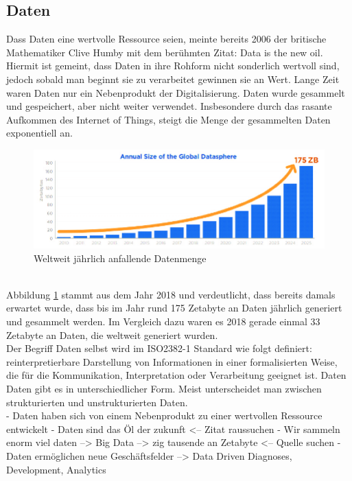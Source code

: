 \begin{onehalfspace}
    \subsection{Daten}
    \label{subsubsec:daten}
        Dass Daten eine wertvolle Ressource seien, meinte bereits 2006 der britische Mathematiker Clive Humby mit dem berühmten Zitat: \glqq{}Data is the new oil\grqq{}. Hiermit ist gemeint, dass Daten in ihre Rohform nicht sonderlich wertvoll sind, jedoch sobald man beginnt sie zu verarbeitet gewinnen sie an Wert. Lange Zeit waren Daten nur ein Nebenprodukt der Digitalisierung. Daten wurde gesammelt und gespeichert, aber nicht weiter verwendet. Insbesondere durch das rasante Aufkommen des Internet of Things, steigt  die Menge der gesammelten Daten exponentiell an.\cite{Otto2019}
        \begin{figure}[h]
            \centering
            \includegraphics[width = 15cm]{Bilder/Annual_Data_Size.png}
            \caption{Weltweit jährlich anfallende Datenmenge \cite{Reinsel2018}}
            \label{fig:DataSize}
        \end{figure} 
        \\
        Abbildung \ref{fig:DataSize} stammt aus dem Jahr 2018 und verdeutlicht, dass bereits damals erwartet wurde, dass bis im Jahr rund 175 Zetabyte an Daten jährlich generiert und gesammelt werden. Im Vergleich dazu waren es 2018 gerade einmal 33 Zetabyte an Daten, die weltweit generiert wurden. \cite{Reinsel2018}
        \\
        Der Begriff Daten selbst wird im ISO2382-1 Standard wie folgt definiert: \glqq{}reinterpretierbare Darstellung von Informationen in einer formalisierten Weise, die für die Kommunikation, Interpretation oder Verarbeitung geeignet ist\grqq{}. \cite{ISO2382} Daten Daten gibt es in unterschiedlicher Form. Meist unterscheidet man zwischen strukturierten und unstrukturierten Daten. 
        \\
        - Daten haben sich von einem Nebenprodukt zu einer wertvollen Ressource entwickelt
        - Daten sind das Öl der zukunft <-- Zitat raussuchen
        - Wir sammeln enorm viel daten --> Big Data --> zig tausende an Zetabyte <-- Quelle suchen
        - Daten ermöglichen neue Geschäftsfelder --> Data Driven Diagnoses, Development, Analytics


\end{onehalfspace}
